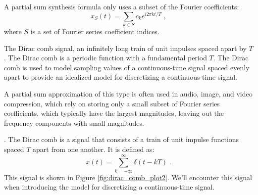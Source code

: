 A partial sum synthesis formula only uses a subset of the Fourier coefficients:
\begin{equation}
x_S(t) = \sum_{k \in S} c_k e^{i 2\pi kt/T} \,\,,
\end{equation}
where $S$ is a set of Fourier series coefficient indices.

\begin{marginfigure}
\begin{center}
\end{center}
\caption{The Dirac comb signal, an infinitely long train of unit impulses spaced apart by $T$. The Dirac comb is a periodic function with a fundamental period $T$. 
The Dirac comb is used to model sampling values of a continuous-time signal spaced evenly apart to provide an idealized model for discretizing a continuous-time signal.}
\label{fig:dirac_comb_plot2}
\end{marginfigure}

A partial sum approximation of this type is often used in audio, image, and video compression, which rely on storing only a small subset of Fourier series coefficients, which typically have the largest magnitudes, leaving out the frequency components with small magnitudes.

.
The Dirac comb is a signal that consists of a train of unit impulse functions spaced $T$ apart from one another. It is defined as:
\begin{equation}
x(t) = \sum_{k=-\infty}^{\infty} \delta(t - k T) \,\,.
\end{equation}
This signal is shown in Figure \ref{fig:dirac_comb_plot2}. We'll encounter this signal when introducing the model for discretizing a continuous-time signal. 

